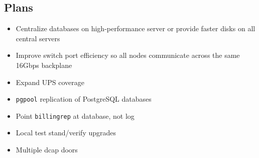 \documentclass{beamer}
\begin{document}
\subsection{Plans}
\begin{frame}
\begin{itemize}
	\item Centralize databases on high-performance server or provide faster disks on all central servers
	\item Improve switch port efficiency so all nodes communicate across the same 16Gbps backplane
	\item Expand UPS coverage
	\item {\tt pgpool} replication of PostgreSQL databases
	\item Point {\tt billingrep} at database, not log
	\item Local test stand/verify upgrades
	\item Multiple dcap doors
\end{itemize}
\end{frame}
\end{document}
